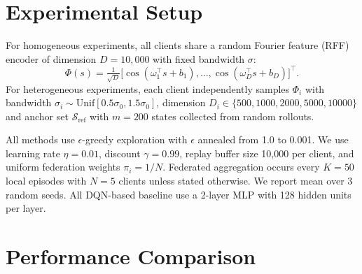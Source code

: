 \documentclass[sigconf,anonymous]{aamas}
\theoremstyle{plain}
\theoremstyle{definition}
\theoremstyle{remark}
\begin{document}
\section{Experimental Setup}
\label{app:exp}
For homogeneous experiments, all clients share a random Fourier feature (RFF) encoder of dimension $D=10{,}000$ with fixed bandwidth $\sigma$:
\[
\Phi(s)=\tfrac{1}{\sqrt{D}}\big[\cos(\omega_1^\top s+b_1),\dots,\cos(\omega_D^\top s+b_D)\big]^\top.
\]
For heterogeneous experiments, each client independently samples $\Phi_i$ with bandwidth $\sigma_i\!\sim\!\mathrm{Unif}[0.5\sigma_0,1.5\sigma_0]$, dimension $D_i\!\in\!\{500,1000,2000,5000,10000\}$ and anchor set $\mathcal{S}_{\text{ref}}$ with $m=200$ states collected from random rollouts.

All methods use $\epsilon$-greedy exploration with $\epsilon$ annealed from 1.0 to 0.001. We use learning rate $\eta=0.01$, discount $\gamma=0.99$, replay buffer size 10,000 per client, and uniform federation weights $\pi_i=1/N$. Federated aggregation occurs every $K=50$ local episodes with $N=5$ clients unless stated otherwise. We report mean over 3 random seeds. All DQN-based baseline use a 2-layer MLP with 128 hidden units per layer.


\section{Performance Comparison}
\label{app:performance}
\end{document}

